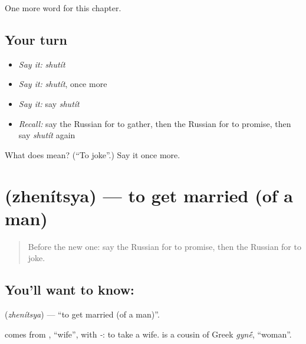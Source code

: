 \begin{grammarlens}[title={What you've built}]
One more word for this chapter.
\end{grammarlens}

\subsection*{Your turn}
\begin{itemize}
\raggedright
  \item \emph{Say it:} \emph{shutít}
  \item \emph{Say it:} \emph{shutít}, once more
  \item \emph{Say it:} say \emph{shutít}
  \item \emph{Recall:} say the Russian for to gather, then the Russian for to promise, then say \emph{shutít} again
\end{itemize}

\begin{tcolorbox}[breakable,colback=teal!4,colframe=teal!35!black,title={Before you move on}]
What does  mean? (\textquotedblleft{}To joke\textquotedblright{}.) Say it once more.
\end{tcolorbox}
\section[\texorpdfstring{\ru{жениться} (zhenítsya)}{жениться (zhenítsya)}]{ (zhenítsya) — to get married (of a man)}

\label{lesson:RU-C209-zhenitsya}



\begin{quote}
Before the new one: say the Russian for to promise, then the Russian for to joke.
\end{quote}

\subsection*{You'll want to know: }
\textbf{} (\emph{zhenítsya}) — \textquotedblleft{}to get married (of a man)\textquotedblright{}.

\begin{cousinweb}
\textbf{} comes from \emph{}, \textquotedblleft{}wife\textquotedblright{}, with \emph{-}: to take a wife. \emph{} is a cousin of Greek \emph{gyn\'{\={e}}}, \textquotedblleft{}woman\textquotedblright{}.
\end{cousinweb}

